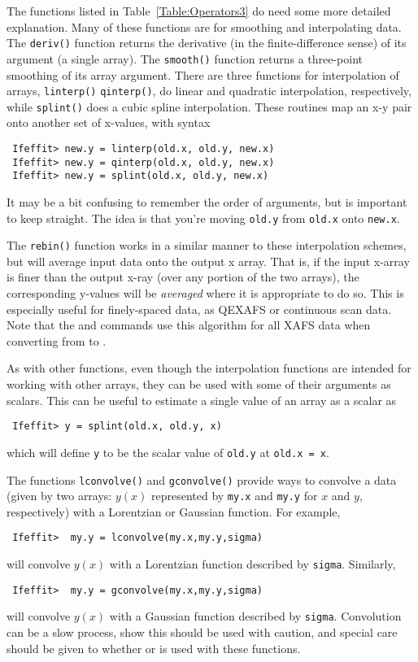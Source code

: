 The functions listed in Table~{\ref{Table:Operators3}} do need some more
detailed explanation.  Many of these functions are for smoothing and
interpolating data. The {\tt{deriv()}} function returns the derivative (in
the finite-difference sense) of its argument (a single array).  The
{\tt{smooth()}} function returns a three-point smoothing of its array
argument.  There are three functions for interpolation of arrays,
{\tt{linterp()}} {\tt{qinterp()}}, do linear and quadratic interpolation,
respectively, while {\tt{splint()}} does a cubic spline interpolation.
These routines map an x-y pair onto another set of x-values, with syntax
\begin{verbatim}
 Ifeffit> new.y = linterp(old.x, old.y, new.x)
 Ifeffit> new.y = qinterp(old.x, old.y, new.x)
 Ifeffit> new.y = splint(old.x, old.y, new.x)
\end{verbatim}
\noindent
It may be a bit confusing to remember the order of arguments, but is
important to keep straight.  The idea is that you're moving
{\texttt{old.y}} from {\texttt{old.x}} onto {\texttt{new.x}}. 

{}
{}

The {\texttt{rebin()}} function works in a similar manner to these
interpolation schemes, but will average input data onto the output x array.
That is, if the input x-array is finer than the output x-ray (over any
portion of the two arrays), the corresponding y-values will be
{\emph{averaged}} where it is appropriate to do so.  This is especially
useful for finely-spaced data, as QEXAFS or continuous scan data.  Note
that the {} and {} commands use this algorithm
for all XAFS data when converting from {\muE} to {\chik}.

As with other functions, even though the interpolation functions are
intended for working with other arrays, they can be used with some of their
arguments as scalars.  This can be useful to estimate a single value of an
array as a scalar as
\begin{verbatim}
 Ifeffit> y = splint(old.x, old.y, x)
\end{verbatim}
\noindent
which will define {\tt{y}} to be the scalar value of {\tt{old.y}} at
{\tt{old.x = x}}.


The functions {\texttt{lconvolve()}} and {\texttt{gconvolve()}} provide
ways to convolve a data (given by two arrays: $y(x)$ represented by
{\tt{my.x}} and {\tt{my.y}} for $x$ and $y$, respectively) with a
Lorentzian or Gaussian function.  For example,
\begin{verbatim} 
 Ifeffit>  my.y = lconvolve(my.x,my.y,sigma)
\end{verbatim} 
\noindent
will convolve $y(x)$ with a Lorentzian function described by {\tt{sigma}}.
Similarly, 
\begin{verbatim} 
 Ifeffit>  my.y = gconvolve(my.x,my.y,sigma)
\end{verbatim} 
\noindent
will convolve $y(x)$ with a Gaussian function described by {\tt{sigma}}.
Convolution can be a slow process, show this should be used with caution,
and special care should be given to whether {} or {} is
used with these functions.


